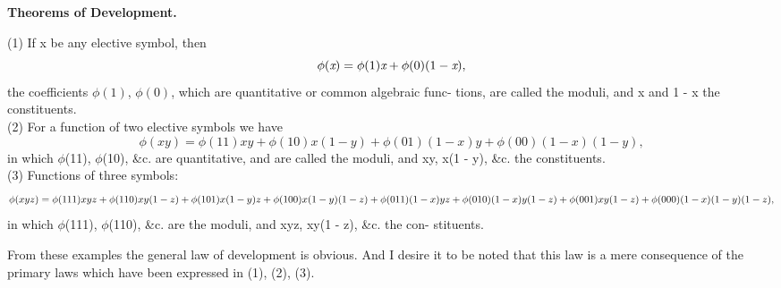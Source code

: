 \documentclass{article}
\begin{document}
{{\large{\textbf{Theorems of Development.}}\vspace{0.1in}\\
\normalsize{(1) If x be any elective symbol, then
                           \begin{equation}\phi(\textit x) = \phi(1)\textit x + \phi(0)(1 - \textit x),\end{equation}
the coefficients $\phi(1)$, $\phi(0)$, which are quantitative or common algebraic func-
tions, are called the moduli, and x and 1 - x the constituents.\vspace{.05in}\\
    (2) For a function of two elective symbols we have\vspace{.1in}\\
  \begin{equation}\phi(xy) = \phi(11)xy + \phi(10)x(1 - y) + \phi(01)(1 - x)y + \phi(00)(1 - x)(1 - y),\end{equation}
in which $\phi$(11), $\phi$(10), \&c. are quantitative, and are called the moduli, and xy,
x(1 - y), \&c. the constituents.\vspace{.1in}\\
    \hspace{.2in}(3) Functions of three symbols:\vspace{.05in}\\
                 \begin{equation}\phi(xyz) = \phi(111)xyz + \phi(110)xy(1 - z)\vspace{.005in}\\
                       			+\phi(101)x(1 - y)z + \phi(100)x(1 - y)(1 - z)\vspace{.005in}\\
                       			+\phi(011)(1 - x)yz + \phi(010)(1 - x)y(1 - z)\vspace{.005in}\\
                       			+\phi(001)xy(1 - z) + \phi(000)(1 - x)(1 - y)(1 - z)\vspace{.005in}\\,\end{equation}
in which $\phi$(111), $\phi$(110), \&c. are the moduli, and xyz, xy(1 - z), \&c. the con-
stituents.\vspace{.05in}

\hspace{.2in}
    From these examples the general law of development is obvious. And I desire
it to be noted that this law is a mere consequence of the primary laws which
have been expressed in (1), (2), (3).\vspace{.05in}

}}}
\end{document}
